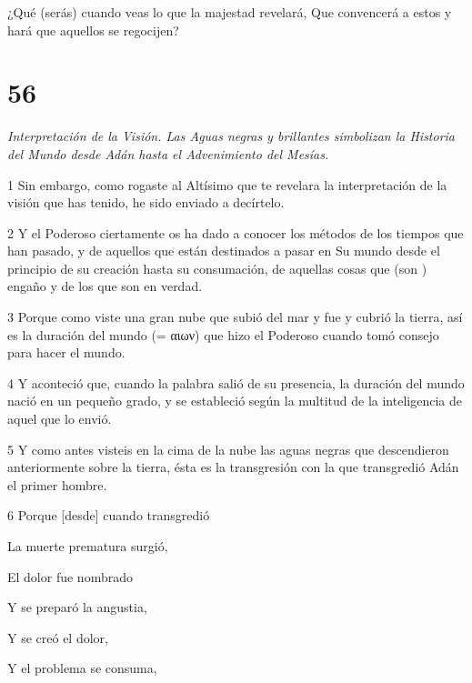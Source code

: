 ¿Qué (serás) cuando veas lo que la majestad revelará, Que convencerá a estos y hará que aquellos se regocijen?

\chapter{56}

\par \textit{Interpretación de la Visión. Las Aguas negras y brillantes simbolizan la Historia del Mundo desde Adán hasta el Advenimiento del Mesías.}


\par 1 Sin embargo, como rogaste al Altísimo que te revelara la interpretación de la visión que has tenido, he sido enviado a decírtelo.

\par 2 Y el Poderoso ciertamente os ha dado a conocer los métodos de los tiempos que han pasado, y de aquellos que están destinados a pasar en Su mundo desde el principio de su creación hasta su consumación, de aquellas cosas que (son ) engaño y de los que son en verdad.

\par 3 Porque como viste una gran nube que subió del mar y fue y cubrió la tierra, así es la duración del mundo (= αιων) que hizo el Poderoso cuando tomó consejo para hacer el mundo.

\par 4 Y aconteció que, cuando la palabra salió de su presencia, la duración del mundo nació en un pequeño grado, y se estableció según la multitud de la inteligencia de aquel que lo envió.

\par 5 Y como antes visteis en la cima de la nube las aguas negras que descendieron anteriormente sobre la tierra, ésta es la transgresión con la que transgredió Adán el primer hombre.

\par 6 Porque [desde] cuando transgredió

\par La muerte prematura surgió,

\par El dolor fue nombrado

\par Y se preparó la angustia,

\par Y se creó el dolor,

\par Y el problema se consuma,

